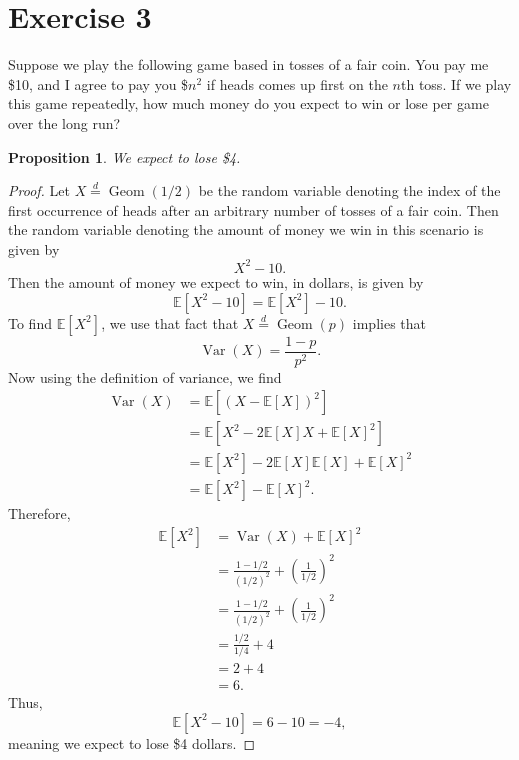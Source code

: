 \documentclass[12pt]{article}
\newtheorem{proposition}{Proposition}
\newenvironment{problem}
    {\begin{lrbox}{\mybox}\begin{minipage}{0.98\textwidth}}
    {\end{minipage}\end{lrbox}\framebox[\textwidth]{\usebox{\mybox}}}
\newcommand{\E}{\mathbb{E}} %
\newcommand{\<}{\left\langle} %
\renewcommand{\>}{\right\rangle} %
\begin{document}
\newpage
\section*{Exercise 3}
\begin{problem}
    Suppose we play the following game based in tosses of a fair coin. You pay me \$10, and I agree to pay you \$$n^2$ if heads comes up first on the $n$th toss. If we play this game repeatedly, how much money do you expect to win or lose per game over the long run?
\end{problem}

\begin{proposition}
    We expect to lose \$4.
\end{proposition}

\begin{proof}
    Let $X \overset{d}{=} \operatorname{Geom}(1/2)$ be the random variable denoting the index of the first occurrence of heads after an arbitrary number of tosses of a fair coin. Then the random variable denoting the amount of money we win in this scenario is given by
    \[X^2 - 10.\]
    Then the amount of money we expect to win, in dollars, is given by
    \[\E[X^2 - 10] = \E[X^2] - 10.\]
    To find $\E[X^2]$, we use that fact that $X \overset{d}{=} \operatorname{Geom}(p)$ implies that
    \[\operatorname{Var}(X) = \frac{1 - p}{p^2}.\]
    Now using the definition of variance, we find
    \begin{align*}
        \operatorname{Var}(X)
            &= \E[(X - \E[X])^2] \\[1em]
            &= \E[X^2 - 2\E[X]X + \E[X]^2] \\[1em]
            &= \E[X^2] - 2\E[X]\E[X] + \E[X]^2 \\[1em]
            &= \E[X^2] - \E[X]^2.
    \end{align*}
    Therefore,
    \begin{align*}
        \E[X^2] 
            &= \operatorname{Var}(X) + \E[X]^2 \\
            &= \frac{1 - 1/2}{(1/2)^2} + \left(\frac1{1/2}\right)^2 \\
            &= \frac{1 - 1/2}{(1/2)^2} + \left(\frac1{1/2}\right)^2 \\
            &= \frac{1/2}{1/4} + 4 \\
            &= 2 + 4 \\
            &= 6.
    \end{align*}
    Thus,
    \[\E[X^2 - 10] = 6 - 10 = -4,\]
    meaning we expect to lose \$4 dollars.

\end{proof}
\end{document}
